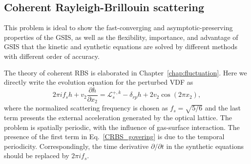 \subsection{Coherent Rayleigh-Brillouin scattering} 

This problem is ideal to show the fast-converging and asymptotic-preserving properties of the GSIS, as well as the flexibility, importance, and advantage of GSIS that the kinetic and synthetic equations are solved by different methods with different order of accuracy. 

The theory of coherent RBS is elaborated in Chapter~\ref{chap:fluctuation}. Here we directly write the evolution equation for the perturbed VDF as 
\begin{equation}\label{CRBS_govering}
2\pi{i}f_sh+v_2\frac{\partial{h}}{\partial{x_2}}=\mathcal{L}_s^{+,k}-\delta_{rp}h+2v_2\cos(2\pi{x_2}),
\end{equation}
where the normalized scattering frequency is chosen as $f_s=\sqrt{5/6}$ and the last term presents the external acceleration generated by the optical lattice. The problem is spatially periodic, with the influence of gas-surface interaction. The presence of the first term in Eq.~\eqref{CRBS_govering} is due to the temporal periodicity. Correspondingly, the time derivative $\partial/\partial t$ in the synthetic equations should be replaced by $2\pi{i}f_s$.


